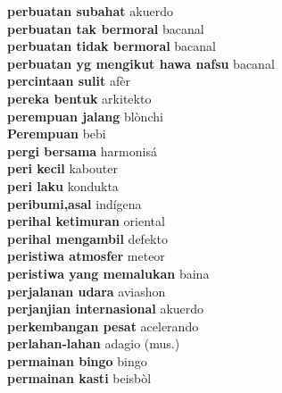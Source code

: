\textbf{ perbuatan subahat  } akuerdo \\
\textbf{ perbuatan tak bermoral  } bacanal \\
\textbf{ perbuatan tidak bermoral  } bacanal \\
\textbf{ perbuatan yg mengikut hawa nafsu  } bacanal \\
\textbf{ percintaan sulit  } afèr \\
\textbf{ pereka bentuk  } arkitekto \\
\textbf{ perempuan jalang  } blònchi \\
\textbf{ Perempuan  } bebi \\
\textbf{ pergi bersama  } harmonisá \\
\textbf{ peri kecil  } kabouter \\
\textbf{ peri laku  } kondukta \\
\textbf{ peribumi,asal  } indígena \\
\textbf{ perihal ketimuran  } oriental \\
\textbf{ perihal mengambil  } defekto \\
\textbf{ peristiwa atmosfer  } meteor \\
\textbf{ peristiwa yang memalukan  } baina \\
\textbf{ perjalanan udara  } aviashon \\
\textbf{ perjanjian internasional  } akuerdo \\
\textbf{ perkembangan pesat  } acelerando \\
\textbf{ perlahan-lahan  } adagio (mus.) \\
\textbf{ permainan bingo  } bingo \\
\textbf{ permainan kasti  } beisbòl \\
